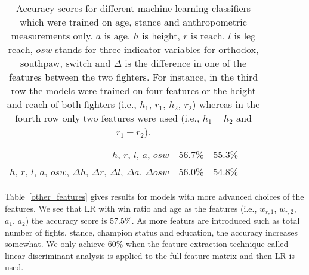 \begin{center}
\begin{table}[h]
\begin{tabular}{r|cccc}
  $h$, $r$, $l$, $a$, $osw$ & 56.7\% & 55.3\% &  \\
  $h$, $r$, $l$, $a$, $osw$, $\Delta h$, $\Delta r$, $\Delta l$, $\Delta a$, $\Delta osw$ & 56.0\% & 54.8\% &  \\
  \bottomrule
\end{tabular}
\caption{Accuracy scores for different machine learning classifiers which were trained
on age, stance and anthropometric measurements only.
$a$ is age, $h$ is height, $r$ is reach, $l$ is leg reach,
$osw$ stands for three indicator variables for orthodox, southpaw,
switch and $\Delta$ is the difference in one of the features between the two
fighters. For instance, in the third row the models were trained on
four features or the height and reach of both fighters (i.e., $h_1$, $r_1$, $h_2$, $r_2$)
whereas in the fourth row only two features were used (i.e., $h_1-h_2$ and $r_1-r_2$).}
\label{anthropomorphic_features}
\end{table}
\end{center}

Table~\ref{other_features} gives results for models with more
advanced choices of the features. We see that LR with win ratio
and age as the features (i.e., $w_{r,1}$, $w_{r,2}$, $a_1$, $a_2$) the
accuracy score is 57.5\%. As more featurs are introduced such as
total number of fights, stance, champion status and education, the
accuracy increases somewhat. We only achieve 60\% when the feature
extraction technique called linear discriminant analysis is applied
to the full feature matrix and then LR is used.

